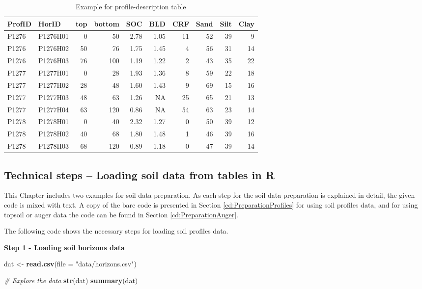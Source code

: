 \documentclass[10pt,b5paper,]{book}
\newenvironment{Shaded}{\begin{snugshade}}{\end{snugshade}}
\newcommand{\CommentTok}[1]{\textcolor[rgb]{0.56,0.35,0.01}{\textit{#1}}}
\newcommand{\DataTypeTok}[1]{\textcolor[rgb]{0.13,0.29,0.53}{#1}}
\newcommand{\KeywordTok}[1]{\textcolor[rgb]{0.13,0.29,0.53}{\textbf{#1}}}
\newcommand{\NormalTok}[1]{#1}
\newcommand{\StringTok}[1]{\textcolor[rgb]{0.31,0.60,0.02}{#1}}
\theoremstyle{definition}
\theoremstyle{definition}
\theoremstyle{definition}
\theoremstyle{remark}
\begin{document}
\begin{table}

\caption{\label{tab:horizon-level}Example for profile-description table}
\centering
\begin{tabular}[t]{llrrrrrrrr}
\toprule
ProfID & HorID & top & bottom & SOC & BLD & CRF & Sand & Silt & Clay\\
\midrule
P1276 & P1276H01 & 0 & 50 & 2.78 & 1.05 & 11 & 52 & 39 & 9\\
P1276 & P1276H02 & 50 & 76 & 1.75 & 1.45 & 4 & 56 & 31 & 14\\
P1276 & P1276H03 & 76 & 100 & 1.19 & 1.22 & 2 & 43 & 35 & 22\\
P1277 & P1277H01 & 0 & 28 & 1.93 & 1.36 & 8 & 59 & 22 & 18\\
P1277 & P1277H02 & 28 & 48 & 1.60 & 1.43 & 9 & 69 & 15 & 16\\
\addlinespace
P1277 & P1277H03 & 48 & 63 & 1.26 & NA & 25 & 65 & 21 & 13\\
P1277 & P1277H04 & 63 & 120 & 0.86 & NA & 54 & 63 & 23 & 14\\
P1278 & P1278H01 & 0 & 40 & 2.32 & 1.27 & 0 & 50 & 39 & 12\\
P1278 & P1278H02 & 40 & 68 & 1.80 & 1.48 & 1 & 46 & 39 & 16\\
P1278 & P1278H03 & 68 & 120 & 0.89 & 1.18 & 0 & 47 & 39 & 14\\
\bottomrule
\end{tabular}
\end{table}

\hypertarget{technical-steps-loading-soil-data-from-tables-in-r}{%
\subsection{Technical steps -- Loading soil data from tables in
R}\label{technical-steps-loading-soil-data-from-tables-in-r}}

This Chapter includes two examples for soil data preparation. As each
step for the soil data preparation is explained in detail, the given
code is mixed with text. A copy of the bare code is presented in Section
\ref{cd:PreparationProfiles} for using soil profiles data, and for using
topsoil or auger data the code can be found in Section
\ref{cd:PreparationAuger}.

The following code shows the necessary steps for loading soil profiles
data.

\textbf{Step 1 - Loading soil horizons data}

\begin{Shaded}
\begin{Highlighting}[]
\NormalTok{dat <-}\StringTok{ }\KeywordTok{read.csv}\NormalTok{(}\DataTypeTok{file =} \StringTok{"data/horizons.csv"}\NormalTok{)}

\CommentTok{# Explore the data}
\KeywordTok{str}\NormalTok{(dat)}
\KeywordTok{summary}\NormalTok{(dat)}
\end{Highlighting}
\end{Shaded}
\end{document}
